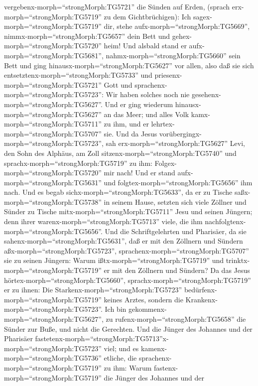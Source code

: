 vergebenx-morph=``strongMorph:TG5721'' die Sünden auf Erden, (sprach
erx-morph=``strongMorph:TG5719'' zu dem Gichtbrüchigen): 
Ich sagex-morph=``strongMorph:TG5719'' dir, stehe
aufx-morph=``strongMorph:TG5669'', nimmx-morph=``strongMorph:TG5657''
dein Bett und gehex-morph=``strongMorph:TG5720'' heim!  Und
alsbald stand er aufx-morph=``strongMorph:TG5681'',
nahmx-morph=``strongMorph:TG5660'' sein Bett und ging
hinausx-morph=``strongMorph:TG5627'' vor allen, also daß sie sich
entsetztenx-morph=``strongMorph:TG5733'' und
priesenx-morph=``strongMorph:TG5721'' Gott und
sprachenx-morph=``strongMorph:TG5723'': Wir haben solches noch nie
gesehenx-morph=``strongMorph:TG5627''.  Und er ging
wiederum hinausx-morph=``strongMorph:TG5627'' an das Meer; und alles
Volk kamx-morph=``strongMorph:TG5711'' zu ihm, und er
lehrtex-morph=``strongMorph:TG5707'' sie.  Und da Jesus
vorübergingx-morph=``strongMorph:TG5723'', sah
erx-morph=``strongMorph:TG5627'' Levi, den Sohn des Alphäus, am Zoll
sitzenx-morph=``strongMorph:TG5740'' und
sprachx-morph=``strongMorph:TG5719'' zu ihm:
Folgex-morph=``strongMorph:TG5720'' mir nach! Und er stand
aufx-morph=``strongMorph:TG5631'' und
folgtex-morph=``strongMorph:TG5656'' ihm nach.  Und es
begab sichx-morph=``strongMorph:TG5633'', da er zu Tische
saßx-morph=``strongMorph:TG5738'' in seinem Hause, setzten sich viele
Zöllner und Sünder zu Tische mitx-morph=``strongMorph:TG5711'' Jesu und
seinen Jüngern; denn ihrer warenx-morph=``strongMorph:TG5713'' viele,
die ihm nachfolgtenx-morph=``strongMorph:TG5656''.  Und die
Schriftgelehrten und Pharisäer, da sie
sahenx-morph=``strongMorph:TG5631'', daß er mit den Zöllnern und Sündern
aßx-morph=``strongMorph:TG5723'', sprachenx-morph=``strongMorph:TG5707''
sie zu seinen Jüngern: Warum ißtx-morph=``strongMorph:TG5719'' und
trinktx-morph=``strongMorph:TG5719'' er mit den Zöllnern und Sündern?
 Da das Jesus hörtex-morph=``strongMorph:TG5660'',
sprachx-morph=``strongMorph:TG5719'' er zu ihnen: Die
Starkenx-morph=``strongMorph:TG5723''
bedürfenx-morph=``strongMorph:TG5719'' keines Arztes, sondern die
Krankenx-morph=``strongMorph:TG5723''. Ich bin
gekommenx-morph=``strongMorph:TG5627'', zu
rufenx-morph=``strongMorph:TG5658'' die Sünder zur Buße, und nicht die
Gerechten.  Und die Jünger des Johannes und der Pharisäer
fastetenx-morph=``strongMorph:TG5713''x-morph=``strongMorph:TG5723''
viel; und es kamenx-morph=``strongMorph:TG5736'' etliche, die
sprachenx-morph=``strongMorph:TG5719'' zu ihm: Warum
fastenx-morph=``strongMorph:TG5719'' die Jünger des Johannes und der
